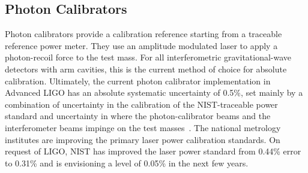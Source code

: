 \subsection{Photon Calibrators}
Photon calibrators provide a calibration reference starting from a traceable reference power meter. They use an amplitude modulated laser to apply a photon-recoil force to the test mass. For all interferometric gravitational-wave detectors with arm cavities, this is the current method of choice for absolute calibration.
Ultimately, the current photon calibrator implementation in Advanced LIGO has an absolute systematic uncertainty of 0.5\%, set mainly by a combination of uncertainty in the calibration of the \ac{NIST}-traceable power standard and uncertainty in where the photon-calibrator beams and the interferometer beams impinge on the test masses~\cite{ALIGOPhotCalib2016, NISTWorkshop2019}. The national metrology institutes are improving the primary laser power calibration standards. On request of \ac{LIGO}, \ac{NIST} has improved the laser power standard from 0.44\% error to 0.31\% and is envisioning a level of 0.05\% in the next few years.

